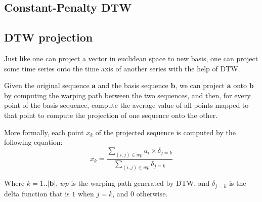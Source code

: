\documentclass[parskip]{cs4rep}
\begin{document}
\subsection{Constant-Penalty DTW}


\subsection{DTW projection}
\label{sec:dtw:projection}
Just like one can project a vector in euclidean space to new basis, one can project some time series onto the time axis of another series with the help of DTW. 

Given the original sequence $\mathbf{a}$ and the basis sequence $\mathbf{b}$, we can project $\mathbf{a}$ onto $\mathbf{b}$ by computing the warping path between the two sequences, 
and then, for every point of the basis sequence, compute the average value of all points mapped to that point to compute the projection of one sequence onto the other.

More formally, each point $x_k$ of the projected sequence is computed by the following equation:
\begin{equation}
    x_k =  \frac{\sum_{(i,j) \in wp} a_i \times \delta_{j=k}}{\sum_{(i,j) \in wp} \delta_{j=k}} 
\end{equation}

Where $k=1..|\mathbf{b}|$, $wp$ is the warping path generated by DTW, and $\delta_{j=k}$ is the delta function that is $1$ when $j=k$, and $0$ otherwise.
\end{document}

